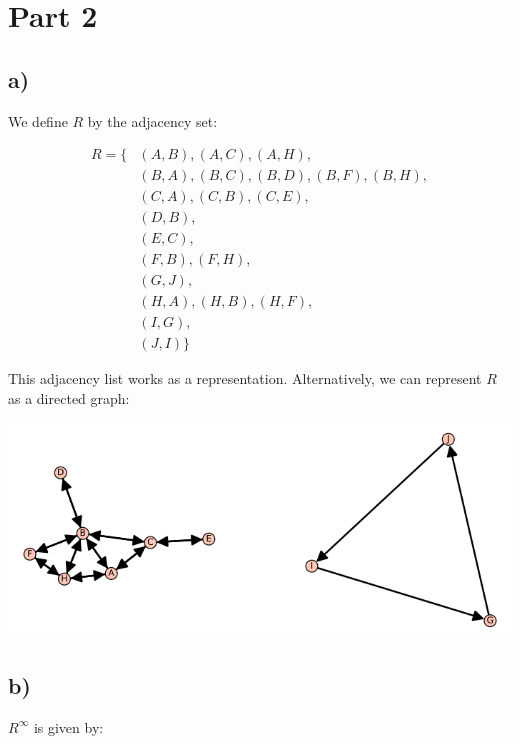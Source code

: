 \documentclass[a4paper]{article}
\begin{document}
\clearpage

\section*{Part 2}

\subsection*{a)}

We define \(R\) by the adjacency set:

\[
\begin{aligned}
R = \{&(A, B), (A, C), (A, H), \\ &(B, A), (B, C), (B, D), (B, F), (B, H), \\ &(C, A), (C, B), (C, E), \\ &(D, B), \\ &(E, C), \\ &(F, B), (F, H), \\ &(G, J), \\ &(H, A), (H, B), (H, F), \\ &(I, G), \\ &(J, I)\}
\end{aligned}
\]

This adjacency list works as a representation. Alternatively, we can represent \(R\) as a directed graph:

\includegraphics[width=\textwidth]{graph}

\subsection*{b)}

\(R^\infty\) is given by:
\end{document}
